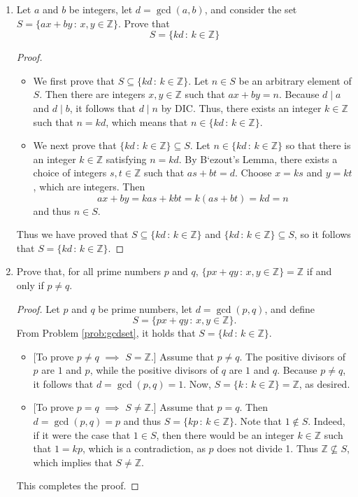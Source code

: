 \documentclass[11pt]{article}
\def\integers{\mathbb{Z}}
\begin{document}
\begin{enumerate}
\begin{Solution}
\end{Solution}

\item Let $a$ and $b$ be integers, let $d=\gcd(a,b)$, and consider the set $S=\{ax+by\,:\, x,y\in\integers\}$. Prove that 
\[
 S = \{kd\,:\,k\in\integers\}
\]\label{prob:gcdset}
\begin{Solution}\begin{proof}
\begin{itemize}
 \item We first prove that $S\subseteq \{kd\,:\, k\in\integers\}$. Let $n\in S$ be an arbitrary element of $S$. Then there are integers $x,y\in\integers$ such that $ax+by=n$. Because $d\mid a$ and $d\mid b$, it follows that $d\mid n$ by DIC. Thus, there exists an integer $k\in\integers$ such that $n=kd$, which means that $n\in\{kd\,:\,k\in\integers\}$. 
 \item We next prove that $\{kd\,:\,k\in\integers\}\subseteq S$. Let $n\in \{kd\,:\,k\in\integers\}$ so that there is an integer $k\in\integers$ satisfying $n=kd$. By B`ezout's Lemma, there exists a choice of integers $s,t\in\integers$ such that $as+bt = d$. Choose $x=ks$ and $y=kt$, which are integers. Then 
 \[
  ax + by = kas + kbt = k(as+bt)=kd=n
 \]
and thus $n\in S$.
\end{itemize}
Thus we have proved that $S\subseteq \{kd\,:\, k\in\integers\}$ and $\{kd\,:\,k\in\integers\}\subseteq S$, so it follows that $S = \{kd\,:\,k\in\integers\}$.\end{proof}
\end{Solution}


\item Prove that, for all prime numbers $p$ and $q$, $\{px+qy\,:\, x,y\in\integers\}=\integers$ if and only if $p\neq q$.


\begin{Solution}
  \begin{proof}
  Let $p$ and $q$ be prime numbers, let $d=\gcd(p,q)$, and define 
  \[
   S = \{px+qy\,:\, x,y\in\integers\}.
  \]
 From Problem \ref{prob:gcdset}, it holds that $S = \{kd\,:\, k\in\integers \}.$ 
 \begin{itemize}
  \item{} [To prove $p\neq q$ $\implies$ $S=\integers$.] Assume that $p\neq q$. The positive divisors of $p$ are $1$ and $p$, while the positive divisors of $q$ are $1$ and $q$. Because $p\neq q$, it follows that $d=\gcd(p,q)=1$.  Now, $S=\{k\,:\, k\in\integers \}=\integers$, as desired.
  \item{} [To prove $p= q$ $\implies$ $S\neq\integers$.] Assume that $p= q$. Then $d=\gcd(p,q)=p $ and thus $S=\{kp\,:\, k\in\integers \}$. Note that $1\notin S$. Indeed, if it were the case that $1\in S$, then there would be an integer $k\in\integers$ such that $1=kp$, which is a contradiction, as $p$ does not divide 1. Thus $\integers\not\subseteq S$, which implies that $S\neq\integers$.
 \end{itemize}
This completes the proof.
 \end{proof}
\end{Solution}


\end{enumerate}
\end{document}
